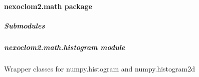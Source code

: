 \documentclass[letterpaper,10pt,english]{sphinxmanual}
\begin{document}
\sphinxstepscope


\paragraph{nexoclom2.math package}
\label{\detokenize{nexoclom2/nexoclom2.math:nexoclom2-math-package}}\label{\detokenize{nexoclom2/nexoclom2.math::doc}}

\subparagraph{Submodules}
\label{\detokenize{nexoclom2/nexoclom2.math:submodules}}
\sphinxstepscope


\subparagraph{nexoclom2.math.histogram module}
\label{\detokenize{nexoclom2/nexoclom2.math.histogram:module-nexoclom2.math.histogram}}\label{\detokenize{nexoclom2/nexoclom2.math.histogram:nexoclom2-math-histogram-module}}\label{\detokenize{nexoclom2/nexoclom2.math.histogram::doc}}
\sphinxAtStartPar
Wrapper classes for numpy.histogram and numpy.histogram2d
\end{document}
